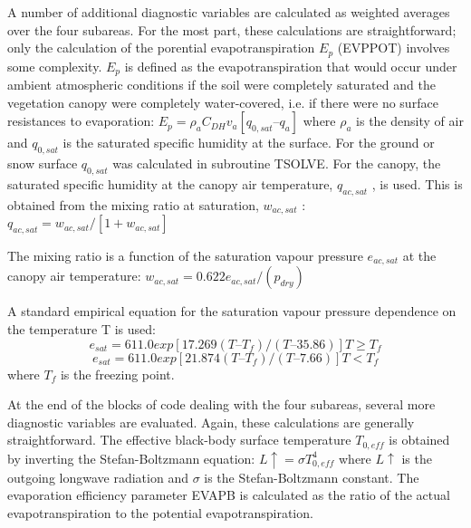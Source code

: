 A number of additional diagnostic variables are calculated as weighted averages over the four subareas. For the most part, these calculations are straightforward; only the calculation of the porential evapotranspiration $E_p$ (E\+V\+P\+P\+O\+T) involves some complexity. $E_p$ is defined as the evapotranspiration that would occur under ambient atmospheric conditions if the soil were completely saturated and the vegetation canopy were completely water-\/covered, i.\+e. if there were no surface resistances to evaporation\+: $E_p = \rho_a C_{DH} v_a [q_{0,sat} – q_a ]$ where $\rho_a$ is the density of air and $q_{0,sat}$ is the saturated specific humidity at the surface. For the ground or snow surface $q_{0,sat}$ was calculated in subroutine T\+S\+O\+L\+V\+E. For the canopy, the saturated specific humidity at the canopy air temperature, $q_{ac,sat}$ , is used. This is obtained from the mixing ratio at saturation, $w_{ac,sat}$ \+: $q_{ac,sat} = w_{ac,sat} /[1 + w_{ac,sat} ]$

The mixing ratio is a function of the saturation vapour pressure $e_{ac,sat}$ at the canopy air temperature\+: $w_{ac,sat} = 0.622 e_{ac,sat} /(p_{dry} )$

A standard empirical equation for the saturation vapour pressure dependence on the temperature T is used\+: \[e_{sat} = 611.0 exp[17.269(T – T_f )/(T – 35.86)] T \geq T_f \] \[e_{sat} = 611.0 exp[21.874(T – T_f )/(T – 7.66)] T < T_f \] where $T_f$ is the freezing point.

At the end of the blocks of code dealing with the four subareas, several more diagnostic variables are evaluated. Again, these calculations are generally straightforward. The effective black-\/body surface temperature $T_{0,eff}$ is obtained by inverting the Stefan-\/\+Boltzmann equation\+: $L\uparrow = \sigma T_{0,eff}^4$ where $L\uparrow$ is the outgoing longwave radiation and $\sigma$ is the Stefan-\/\+Boltzmann constant. The evaporation efficiency parameter E\+V\+A\+P\+B is calculated as the ratio of the actual evapotranspiration to the potential evapotranspiration.
